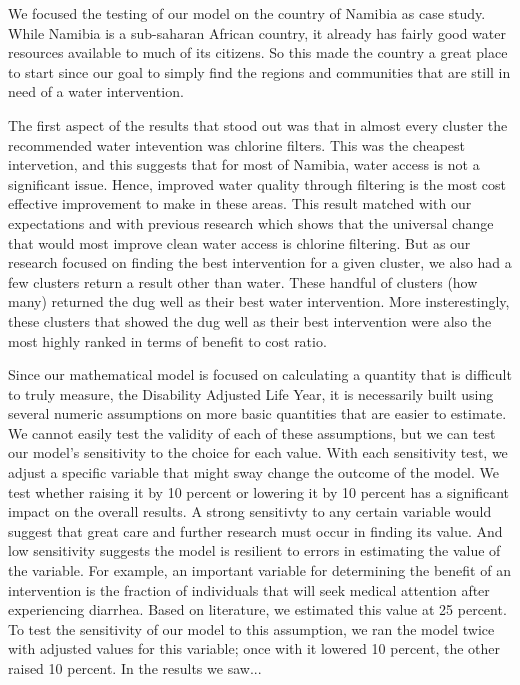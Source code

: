 We focused the testing of our model on the country of Namibia as case study.
While Namibia is a sub-saharan African country, it already has fairly good water resources available to much of its citizens.
So this made the country a great place to start since our goal to simply find the regions and communities that are still in need of a water intervention.  

The first aspect of the results that stood out was that in almost every cluster the recommended water intevention was chlorine filters.
This was the cheapest intervetion, and this suggests that for most of Namibia, water access is not a significant issue.
Hence, improved water quality through filtering is the most cost effective improvement to make in these areas.
This result matched with our expectations and with previous research which shows that the universal change that would most improve clean water access is chlorine filtering.
But as our research focused on finding the best intervention for a given cluster, we also had a few clusters return a result other than water.
These handful of clusters (how many) returned the dug well as their best water intervention.
More insterestingly, these clusters that showed the dug well as their best intervention were also the most highly ranked in terms of benefit to cost ratio.  

Since our mathematical model is focused on calculating a quantity that is difficult to truly measure, the Disability Adjusted Life Year, it is necessarily built using several numeric assumptions on more basic quantities that are easier to estimate.
We cannot easily test the validity of each of these assumptions, but we can test our model's sensitivity to the choice for each value.
With each sensitivity test, we adjust a specific variable that might sway change the outcome of the model.
We test whether raising it by 10 percent or lowering it by 10 percent has a significant impact on the overall results.
A strong sensitivty to any certain variable would suggest that great care and further research must occur in finding its value.
And low sensitivity suggests the model is resilient to errors in estimating the value of the variable.
For example, an important variable for determining the benefit of an intervention is the fraction of individuals that will seek medical attention after experiencing diarrhea.
Based on literature, we estimated this value at 25 percent.
To test the sensitivity of our model to this assumption, we ran the model twice with adjusted values for this variable; once with it lowered 10 percent, the other raised 10 percent.
In the results we saw...  

